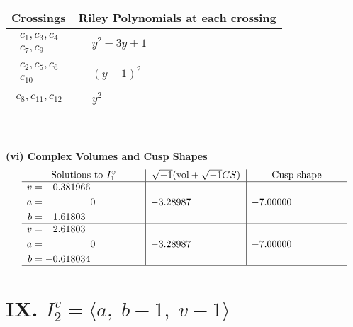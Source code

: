 \documentclass[1p]{elsarticle_modified}
\theoremstyle{definition}
\newcommand{\I}{\sqrt{-1}}
\begin{document}
\begin{tabular}{m{50pt}|m{274pt}}
Crossings & \hspace{64pt}Riley Polynomials at each crossing \\
\hline $$\begin{aligned}c_{1},c_{3},c_{4}\\c_{7},c_{9}\end{aligned}$$&$\begin{aligned}
&y^2-3 y+1
\end{aligned}$\\
\hline $$\begin{aligned}c_{2},c_{5},c_{6}\\c_{10}\end{aligned}$$&$\begin{aligned}
&(y-1)^2
\end{aligned}$\\
\hline $$\begin{aligned}c_{8},c_{11},c_{12}\end{aligned}$$&$\begin{aligned}
&y^2
\end{aligned}$\\
\hline
\end{tabular}\\~\\
\newpage\flushleft \textbf{(vi) Complex Volumes and Cusp Shapes}
$$\begin{array}{c|c|c}  
\text{Solutions to }I^v_{1}& \I (\text{vol} + \sqrt{-1}CS) & \text{Cusp shape}\\
 \hline 
\begin{aligned}
v &= \phantom{-}0.381966\phantom{ +0.000000I} \\
a &= \phantom{-0.000000 } 0 \\
b &= \phantom{-}1.61803\phantom{ +0.000000I}\end{aligned}
 & -3.28987\phantom{ +0.000000I} & -7.00000\phantom{ +0.000000I} \\ \hline\begin{aligned}
v &= \phantom{-}2.61803\phantom{ +0.000000I} \\
a &= \phantom{-0.000000 } 0 \\
b &= -0.618034\phantom{ +0.000000I}\end{aligned}
 & -3.28987\phantom{ +0.000000I} & -7.00000\phantom{ +0.000000I}\\
 \hline 
 \end{array}$$\newpage\newpage\renewcommand{\arraystretch}{1}
\centering \section*{IX. $I^v_{2}= \langle a,\;b-1,\;v-1 \rangle$}
\end{document}
